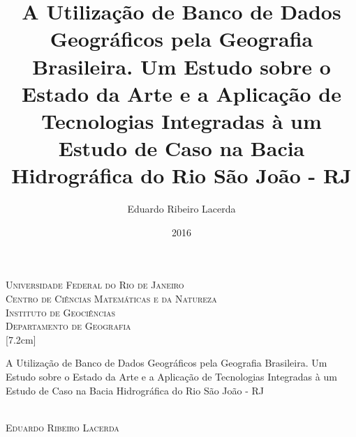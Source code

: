 \documentclass[12pt,a4paper,openany]{book} %
\title{A Utilização de Banco de Dados Geográficos pela Geografia Brasileira. Um Estudo sobre o Estado da Arte e a Aplicação de Tecnologias Integradas à um Estudo de Caso na Bacia Hidrográfica do Rio São João - RJ}
\author{Eduardo Ribeiro Lacerda}
\date{2016}
\begin{document}
	
	\begin{titlepage}
		
		\begin{center}
			\textsc{\large Universidade Federal do Rio de Janeiro} \\
			\textsc{\large Centro de Ciências Matemáticas e da Natureza} \\
			\textsc{\large Instituto de Geociências} \\
			\textsc{\large Departamento de Geografia} \\
			[7.2cm]
		\end{center}
		\Large{A Utilização de Banco de Dados Geográficos pela Geografia Brasileira. Um Estudo sobre o Estado da Arte e a Aplicação de Tecnologias Integradas à um Estudo de Caso na Bacia Hidrográfica do Rio São João - RJ} \\
		[6cm] \\
		\begin{flushright}
			\textsc{\large Eduardo Ribeiro Lacerda \\}
		\end{flushright} 
	\end{titlepage}
	
	
\end{document}

